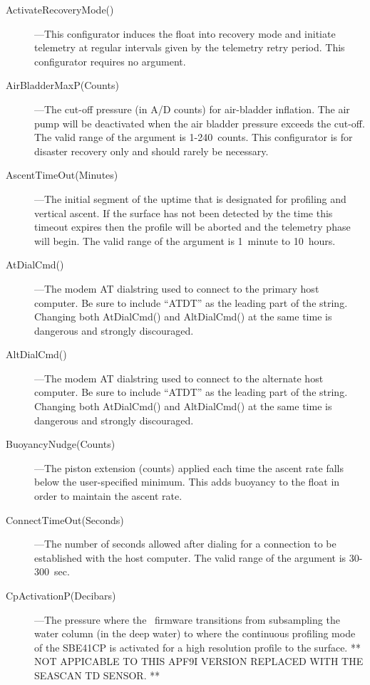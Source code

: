 \begin{description}
\item[ActivateRecoveryMode()]---This configurator induces the float into
  recovery mode and initiate telemetry at regular intervals given by the
  telemetry retry period.  This configurator requires no argument.

\item[AirBladderMaxP(Counts)]---The cut-off pressure (in A/D counts) for
  air-bladder inflation.  The air pump will be deactivated when the air
  bladder pressure exceeds the cut-off.  The valid range of the argument is
  1-240~counts. This configurator is for disaster recovery only and should
  rarely be necessary.

\item[AscentTimeOut(Minutes)]---The initial segment of the uptime that is
  designated for profiling and vertical ascent.  If the surface has not been
  detected by the time this timeout expires then the profile will be aborted
  and the telemetry phase will begin.  The valid range of the argument is
  1~minute to 10~hours.
                               
\item[AtDialCmd()]---The modem AT dialstring used to connect to the primary
  host computer.  Be sure to include ``ATDT'' as the leading part of the
  string.  Changing both AtDialCmd() and AltDialCmd() at the same time is
  dangerous and strongly discouraged.
                               
\item[AltDialCmd()]---The modem AT dialstring used to connect to the
  alternate host computer.  Be sure to include ``ATDT'' as the leading part
  of the string.  Changing both AtDialCmd() and AltDialCmd() at the same
  time is dangerous and strongly discouraged.

\item[BuoyancyNudge(Counts)]---The piston extension (counts) applied each
  time the ascent rate falls below the user-specified minimum.  This adds
  buoyancy to the float in order to maintain the ascent rate.

\item[ConnectTimeOut(Seconds)]---The number of seconds allowed after dialing
  for a connection to be established with the host computer.  The valid
  range of the argument is 30-300~sec.

\item[CpActivationP(Decibars)]---The pressure where the \apf\ firmware
  transitions from subsampling the water column (in the deep water) to where
  the continuous profiling mode of the SBE41CP is activated for a high
  resolution profile to the surface.  
  ** NOT APPICABLE TO THIS APF9I VERSION REPLACED WITH THE SEASCAN TD SENSOR. ** 


\end{description}
